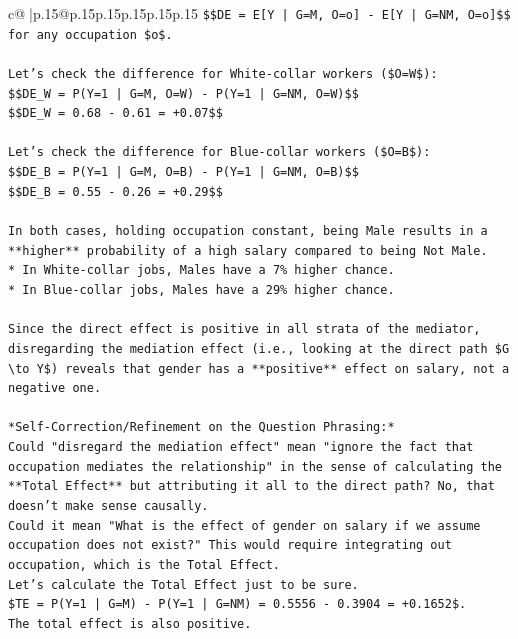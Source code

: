 \documentclass{article}
\begin{document}
{\begin{supertabular}{c@{$\;$}|p{.15\linewidth}@{}p{.15\linewidth}p{.15\linewidth}p{.15\linewidth}p{.15\linewidth}p{.15\linewidth}}
{{{\texttt{\$\$DE = E{[}Y | G=M, O=o{]} {-} E{[}Y | G=NM, O=o{]}\$\$} \\
\texttt{for any occupation \$o\$.} \\
\\ 
\texttt{Let's check the difference for White{-}collar workers (\$O=W\$):} \\
\texttt{\$\$DE\_W = P(Y=1 | G=M, O=W) {-} P(Y=1 | G=NM, O=W)\$\$} \\
\texttt{\$\$DE\_W = 0.68 {-} 0.61 = +0.07\$\$} \\
\\ 
\texttt{Let's check the difference for Blue{-}collar workers (\$O=B\$):} \\
\texttt{\$\$DE\_B = P(Y=1 | G=M, O=B) {-} P(Y=1 | G=NM, O=B)\$\$} \\
\texttt{\$\$DE\_B = 0.55 {-} 0.26 = +0.29\$\$} \\
\\ 
\texttt{In both cases, holding occupation constant, being Male results in a **higher** probability of a high salary compared to being Not Male.} \\
\texttt{*   In White{-}collar jobs, Males have a 7\% higher chance.} \\
\texttt{*   In Blue{-}collar jobs, Males have a 29\% higher chance.} \\
\\ 
\texttt{Since the direct effect is positive in all strata of the mediator, disregarding the mediation effect (i.e., looking at the direct path \$G \textbackslash{}to Y\$) reveals that gender has a **positive** effect on salary, not a negative one.} \\
\\ 
\texttt{*Self{-}Correction/Refinement on the Question Phrasing:*} \\
\texttt{Could "disregard the mediation effect" mean "ignore the fact that occupation mediates the relationship" in the sense of calculating the **Total Effect** but attributing it all to the direct path? No, that doesn't make sense causally.} \\
\texttt{Could it mean "What is the effect of gender on salary if we assume occupation does not exist?" This would require integrating out occupation, which is the Total Effect.} \\
\texttt{Let's calculate the Total Effect just to be sure.} \\
\texttt{\$TE = P(Y=1 | G=M) {-} P(Y=1 | G=NM) = 0.5556 {-} 0.3904 = +0.1652\$.} \\
\texttt{The total effect is also positive.} \\
}}}
\end{supertabular}}
\end{document}

